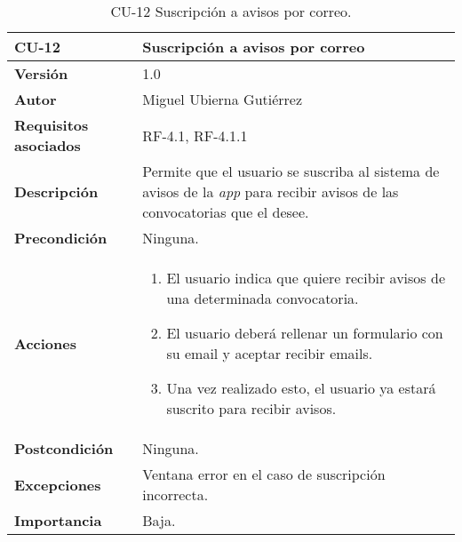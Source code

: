 \begin{table}[p]
	\centering
	\begin{tabularx}{\linewidth}{ p{} p{} }
		\toprule
		\textbf{CU-12}    & \textbf{Suscripción a avisos por correo}\\
		\toprule
		\textbf{Versión}              & 1.0    \\
		\textbf{Autor}                & Miguel Ubierna Gutiérrez \\
		\textbf{Requisitos asociados} & RF-4.1, RF-4.1.1  \\
		\textbf{Descripción}          & Permite que el usuario se suscriba al sistema de avisos de la \textit{app} para recibir avisos de las convocatorias que el desee.  \\
		\textbf{Precondición}         & Ninguna.\\
		\textbf{Acciones}             &
		\begin{enumerate}
			\def\labelenumi{\arabic{enumi}.}
			\tightlist
			\item El usuario indica que quiere recibir avisos de una determinada convocatoria.
                \item El usuario deberá rellenar un formulario con su email y aceptar recibir emails.
                \item Una vez realizado esto, el usuario ya estará suscrito para recibir avisos.
		\end{enumerate}\\
		\textbf{Postcondición}        & Ninguna. \\
		\textbf{Excepciones}          & Ventana error en el caso de suscripción incorrecta.  \\
		\textbf{Importancia}          & Baja.  \\
		\bottomrule
	\end{tabularx}
	\caption{CU-12 Suscripción a avisos por correo.}
\end{table}


